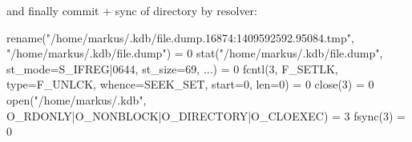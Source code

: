 and finally commit + sync of directory by resolver\+: \begin{DoxyVerb}    rename("/home/markus/.kdb/file.dump.16874:1409592592.95084.tmp",
                    "/home/markus/.kdb/file.dump") = 0
    stat("/home/markus/.kdb/file.dump", {st_mode=S_IFREG|0644,
                    st_size=69, ...}) = 0
    fcntl(3, F_SETLK, {type=F_UNLCK, whence=SEEK_SET, start=0,
                    len=0}) = 0
    close(3)                                = 0
    open("/home/markus/.kdb",
                    O_RDONLY|O_NONBLOCK|O_DIRECTORY|O_CLOEXEC) = 3
    fsync(3)                                = 0\end{DoxyVerb}
 